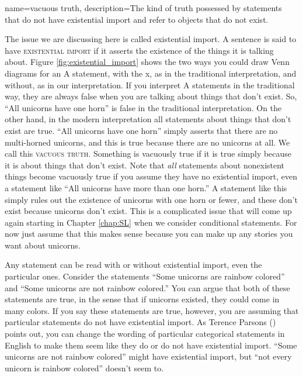 {
name=vacuous truth,
description={The kind of truth possessed by statements that do not have existential import and refer to objects that do not exist.}
}

The issue we are discussing here is called existential import. A sentence is said to have \textsc{\gls{existential import}} \label{def:Existential_import} if it asserts the existence of the things it is talking about. Figure \ref{fig:existential_import} shows the two ways you could draw Venn diagrams for an A statement, with the x, as in the traditional interpretation, and without, as in our interpretation. If you interpret A statements in the traditional way, they are always false when you are talking about things that don't exist. So, ``All unicorns have one horn'' is false in the traditional interpretation. On the other hand, in the modern interpretation all statements about things that don't exist are true. ``All unicorns have one horn'' simply asserts that there are no multi-horned unicorns, and this is true because there are no unicorns at all. We call this \textsc{\gls{vacuous truth}}. Something is vacuously true \label{def:Vacuous_truth} if it is true simply because it is about things that don't exist. Note that \emph{all} statements about nonexistent things become vacuously true if you assume they have no existential import, even a statement like ``All unicorns have more than one horn.'' A statement like this simply rules out the existence of unicorns with one horn or fewer, and these don't exist because unicorns don't exist. This is a complicated issue that will come up again starting in Chapter \ref{chap:SL} when we consider conditional statements. For now just assume that this makes sense because you can make up any stories you want about unicorns.



Any statement can be read with or without existential import, even the particular ones. Consider the statements ``Some unicorns are rainbow colored'' and ``Some unicorns are not rainbow colored.'' You can argue that both of these statements are true, in the sense that if unicorns existed, they could come in many colors. If you say these statements are true, however, you are assuming that particular statements do not have existential import. As Terence Parsons (\cite*{Parsons1997}) points out, you can change the wording of particular categorical statements in English to make them seem like they do or do not have existential import. ``Some unicorns are not rainbow colored'' might have existential import, but ``not every unicorn is rainbow colored'' doesn't seem to.

